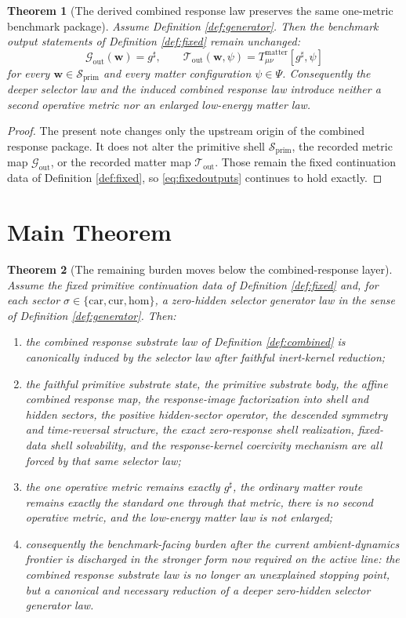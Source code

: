 \documentclass[11pt]{article}
\newcommand{\CompletedMetric}{g^{\sharp}}
\newcommand{\Car}{\mathrm{car}}
\newcommand{\Cur}{\mathrm{cur}}
\newcommand{\Hom}{\mathrm{hom}}
\newcommand{\PrimShell}{\mathcal S_{\mathrm{prim}}}
\newcommand{\MetricOut}{\mathscr G_{\mathrm{out}}}
\newcommand{\MatterOut}{\mathscr T_{\mathrm{out}}}
\newtheorem{theorem}{Theorem}
\begin{document}
\begin{theorem}[The derived combined response law preserves the same one-metric benchmark package]
\label{thm:outputs}
Assume Definition \ref{def:generator}. Then the benchmark output statements of Definition \ref{def:fixed} remain unchanged:
\[
\MetricOut(\mathbf w)=\CompletedMetric,
\qquad
\MatterOut(\mathbf w,\psi)
=
T_{\mu\nu}^{\mathrm{matter}}[\CompletedMetric,\psi]
\]
for every \(\mathbf w\in\PrimShell\) and every matter configuration \(\psi\in\Psi\). Consequently the deeper selector law and the induced combined response law introduce neither a second operative metric nor an enlarged low-energy matter law.
\end{theorem}

\begin{proof}
The present note changes only the upstream origin of the combined response package. It does not alter the primitive shell \(\PrimShell\), the recorded metric map \(\MetricOut\), or the recorded matter map \(\MatterOut\). Those remain the fixed continuation data of Definition \ref{def:fixed}, so \eqref{eq:fixedoutputs} continues to hold exactly.
\end{proof}

\section{Main Theorem}

\begin{theorem}[The remaining burden moves below the combined-response layer]
\label{thm:main}
Assume the fixed primitive continuation data of Definition \ref{def:fixed} and, for each sector \(\sigma\in\{\Car,\Cur,\Hom\}\), a zero-hidden selector generator law in the sense of Definition \ref{def:generator}. Then:
\begin{enumerate}
    \item the combined response substrate law of Definition \ref{def:combined} is canonically induced by the selector law after faithful inert-kernel reduction;
    \item the faithful primitive substrate state, the primitive substrate body, the affine combined response map, the response-image factorization into shell and hidden sectors, the positive hidden-sector operator, the descended symmetry and time-reversal structure, the exact zero-response shell realization, fixed-data shell solvability, and the response-kernel coercivity mechanism are all forced by that same selector law;
    \item the one operative metric remains exactly \(\CompletedMetric\), the ordinary matter route remains exactly the standard one through that metric, there is no second operative metric, and the low-energy matter law is not enlarged;
    \item consequently the benchmark-facing burden after the current ambient-dynamics frontier is discharged in the stronger form now required on the active line: the combined response substrate law is no longer an unexplained stopping point, but a canonical and necessary reduction of a deeper zero-hidden selector generator law.
\end{enumerate}
\end{theorem}
\end{document}
